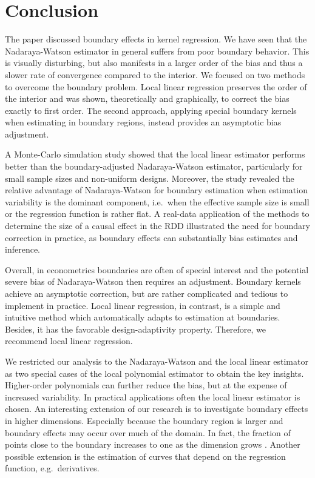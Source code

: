 


\section{Conclusion} \label{sec:conclusion}

The paper discussed boundary effects in kernel regression.
We have seen that the Nadaraya-Watson estimator in general suffers from poor boundary behavior.
This is visually disturbing,
but also manifests in a larger order of the bias and thus a slower rate of convergence compared to the interior.
We focused on two methods to overcome the boundary problem.
Local linear regression preserves the order of the interior and was shown, theoretically and graphically,
to correct the bias exactly to first order.
The second approach, applying special boundary kernels when estimating in boundary regions,
instead provides an asymptotic bias adjustment.

A Monte-Carlo simulation study showed that the local linear estimator performs better than the boundary-adjusted Nadaraya-Watson estimator,
particularly for small sample sizes and non-uniform designs.
Moreover, the study revealed the relative advantage of Nadaraya-Watson for boundary estimation when estimation variability is the dominant component,
i.e.\ when the effective sample size is small or the regression function is rather flat.
A real-data application of the methods to determine the size of a causal effect in the RDD illustrated the need for boundary correction in practice,
as boundary effects can substantially bias estimates and inference.

Overall, in econometrics boundaries are often of special interest and the potential severe bias of Nadaraya-Watson then requires an adjustment.
Boundary kernels achieve an asymptotic correction,
but are rather complicated and tedious to implement in practice.
Local linear regression, in contrast, is a simple and intuitive method which automatically adapts to estimation at boundaries.
Besides, it has the favorable design-adaptivity property.
Therefore, we recommend local linear regression.

We restricted our analysis to the Nadaraya-Watson and the local linear estimator as two special cases of the local polynomial estimator to obtain the key insights.
Higher-order polynomials can further reduce the bias,
but at the expense of increased variability.
In practical applications often the local linear estimator is chosen.
An interesting extension of our research is to investigate boundary effects in higher dimensions.
Especially because the boundary region is larger and boundary effects may occur over much of the domain.
In fact, the fraction of points close to the boundary increases to one as the dimension grows \parencite[200]{Hastie_2009}.
Another possible extension is the estimation of curves that depend on the regression function,
e.g.\ derivatives.